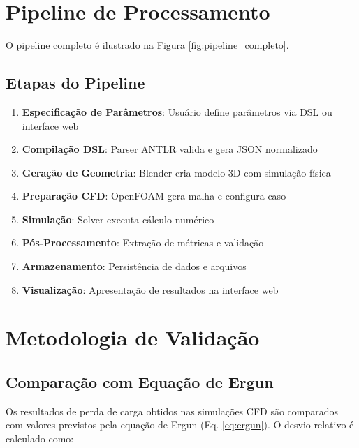 \section{Pipeline de Processamento}

O pipeline completo é ilustrado na Figura \ref{fig:pipeline_completo}.

\subsection{Etapas do Pipeline}

\begin{enumerate}
    \item \textbf{Especificação de Parâmetros}: Usuário define parâmetros via DSL ou interface web
    \item \textbf{Compilação DSL}: Parser ANTLR valida e gera JSON normalizado
    \item \textbf{Geração de Geometria}: Blender cria modelo 3D com simulação física
    \item \textbf{Preparação CFD}: OpenFOAM gera malha e configura caso
    \item \textbf{Simulação}: Solver executa cálculo numérico
    \item \textbf{Pós-Processamento}: Extração de métricas e validação
    \item \textbf{Armazenamento}: Persistência de dados e arquivos
    \item \textbf{Visualização}: Apresentação de resultados na interface web
\end{enumerate}

\section{Metodologia de Validação}

\subsection{Comparação com Equação de Ergun}

Os resultados de perda de carga obtidos nas simulações CFD são comparados com valores previstos pela equação de Ergun (Eq. \ref{eq:ergun}). O desvio relativo é calculado como:

